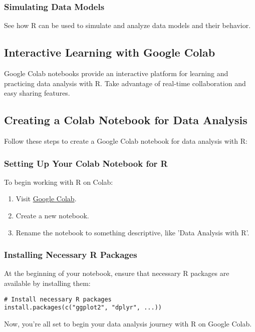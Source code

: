 \documentclass[a4paper,12pt]{book}
\begin{document}
\subsubsection*{Simulating Data Models}
See how R can be used to simulate and analyze data models and their behavior.

\subsection*{Interactive Learning with Google Colab}

Google Colab notebooks provide an interactive platform for learning and practicing data analysis with R. Take advantage of real-time collaboration and easy sharing features.

\subsection*{Creating a Colab Notebook for Data Analysis}

Follow these steps to create a Google Colab notebook for data analysis with R:

\subsubsection*{Setting Up Your Colab Notebook for R}
To begin working with R on Colab:

\begin{enumerate}
    \item Visit \href{https://colab.research.google.com/}{Google Colab}.
    \item Create a new notebook.
    \item Rename the notebook to something descriptive, like 'Data Analysis with R'.
\end{enumerate}

\subsubsection*{Installing Necessary R Packages}
At the beginning of your notebook, ensure that necessary R packages are available by installing them:

\begin{verbatim}
# Install necessary R packages
install.packages(c("ggplot2", "dplyr", ...))
\end{verbatim}

Now, you're all set to begin your data analysis journey with R on Google Colab.


%



\cleardoublepage %
\printbibliography
\end{document}
